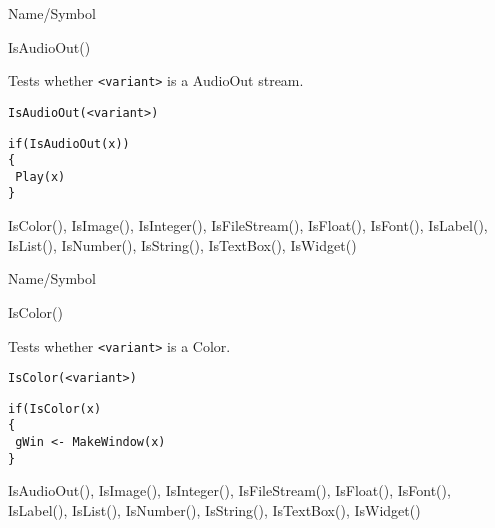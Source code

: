 \rl


\begin{desc}{Name/Symbol}
\item[Name/Symbol]	IsAudioOut()

\item[Description]	Tests whether \verb+<variant>+ is a AudioOut stream.

\item[Usage]
\begin{verbatim}
IsAudioOut(<variant>)
\end{verbatim}

\item[Example]
\begin{verbatim}
if(IsAudioOut(x))
{
 Play(x)
}
\end{verbatim}

\item[See Also]	IsColor(), IsImage(), IsInteger(), IsFileStream(), 
		IsFloat(), IsFont(), IsLabel(), IsList(), IsNumber(), 
		IsString(), IsTextBox(), IsWidget()
\end{desc}

\rl


\begin{desc}{Name/Symbol}
\item[Name/Symbol]	IsColor()

\item[Description]	Tests whether \verb+<variant>+ is a Color.

\item[Usage]
\begin{verbatim}
IsColor(<variant>)
\end{verbatim}

\item[Example]
\begin{verbatim}
if(IsColor(x)
{
 gWin <- MakeWindow(x)
}
\end{verbatim}

\item[See Also]		IsAudioOut(), IsImage(), IsInteger(), IsFileStream(), IsFloat(), IsFont(), IsLabel(), IsList(), IsNumber(), IsString(), IsTextBox(), IsWidget()
\end{desc}

\rl




